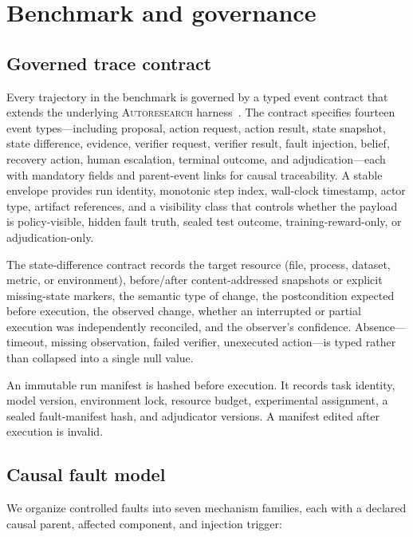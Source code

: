 \section{Benchmark and governance}
\label{sec:benchmark}

\subsection{Governed trace contract}

Every trajectory in the benchmark is governed by a typed event contract
that extends the underlying \textsc{Autoresearch} harness~\citep{autoresearch2026}.
The contract specifies fourteen event types—including proposal, action
request, action result, state snapshot, state difference, evidence,
verifier request, verifier result, fault injection, belief, recovery
action, human escalation, terminal outcome, and adjudication—each with
mandatory fields and parent-event links for causal traceability. A stable
envelope provides run identity, monotonic step index, wall-clock timestamp,
actor type, artifact references, and a visibility class that controls
whether the payload is policy-visible, hidden fault truth, sealed test
outcome, training-reward-only, or adjudication-only.

The state-difference contract records the target resource (file, process,
dataset, metric, or environment), before/after content-addressed snapshots
or explicit missing-state markers, the semantic type of change, the
postcondition expected before execution, the observed change, whether an
interrupted or partial execution was independently reconciled, and the
observer's confidence. Absence—timeout, missing observation, failed
verifier, unexecuted action—is typed rather than collapsed into a single
null value.

An immutable run manifest is hashed before execution. It records task
identity, model version, environment lock, resource budget, experimental
assignment, a sealed fault-manifest hash, and adjudicator versions. A
manifest edited after execution is invalid.

\subsection{Causal fault model}

We organize controlled faults into seven mechanism families, each with a
declared causal parent, affected component, and injection trigger:

